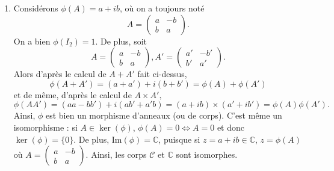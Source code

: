 \documentclass[11pt,a4paper]{article}
\begin{document}
\begin{corrige}
\begin{enumerate}
			De plus, $(\mathcal C,+,\times)$ est bien un anneau commutatif car le calcul précédent montre facilement que $A\times A'=A'\times A.$ Pour conclure, il faut encore démontrer que si on choisit $A\in\mathcal C$, $A\neq 0,$ alors $A$ est inversible et $A^{-1}\in\mathcal C$. Notons toujours 
			$$A=\begin{pmatrix}a&-b\\b&a\end{pmatrix}.$$
			Il est facile de voir que $A$ est inversible (par exemple par ce que son déterminant est $a^2+b^2\neq 0$). De plus, l'inverse de $A$ est 
			$$A^{-1}=\frac{1}{a^2+b^2}\begin{pmatrix}
				a&b\\
				-b&a
			\end{pmatrix}$$
			et cette matrice est bien dans $\mathcal C$ (choisir $a'=a/(a^2+b^2)$ et $b'=-b/(a^2+b^2)$). Ainsi, on a bien démontré que $\mathcal C$ est un corps.
			
			\item  Considérons $\phi(A)=a+ib$, où on a toujours noté 
			$$A=\begin{pmatrix}a&-b\\b&a\end{pmatrix}.$$
			On a bien $\phi(I_2)=1$. De plus, soit
			$$A=\begin{pmatrix}a&-b\\b&a\end{pmatrix}, A'=\begin{pmatrix}a'&-b'\\b'&a'\end{pmatrix}.$$
			Alors d'après le calcul de $A+A'$ fait ci-dessus,
			$$\phi(A+A')=(a+a')+i(b+b')=\phi(A)+\phi(A')$$
			et de même, d'après le calcul de $A\times A',$
			$$\phi(AA')=(aa-bb')+i(ab'+a'b)=(a+ib)\times(a'+ib')=\phi(A)\phi(A').$$
			Ainsi, $\phi$ est bien un morphisme d'anneaux (ou de corps). C'est même un isomorphisme : si $A\in \ker(\phi)$, $\phi(A)=0\iff A=0$ et donc 
			$\ker(\phi)=\{0\}$. De plus, $\textrm{Im}(\phi)=\mathbb C$, 
			puisque si $z=a+ib\in\mathbb C$, $z=\phi(A)$ où $A=\begin{pmatrix}a&-b\\b&a\end{pmatrix}.$ Ainsi, les corps $\mathcal C$ et $\mathbb C$ sont isomorphes.
			
		\end{enumerate}
	\end{corrige}
	
\end{document}
